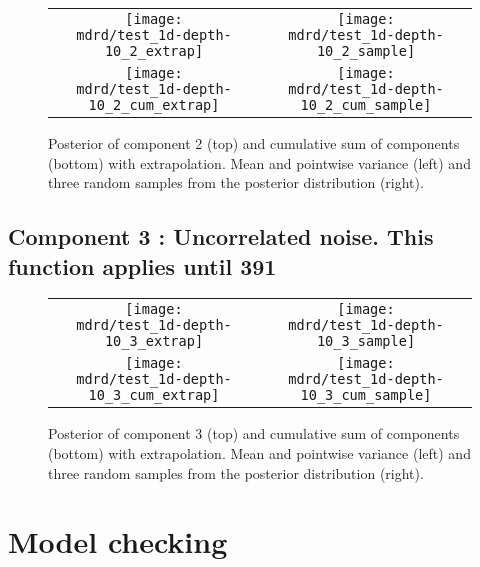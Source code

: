 \documentclass{article} %
\begin{document}


\begin{figure}[H]
\newcommand{\wmgd}{0.5\columnwidth}
\newcommand{\hmgd}{3.0cm}
\newcommand{\mdrd}{test_1d-depth-10}
\newcommand{\mbm}{\hspace{-0.3cm}}
\begin{tabular}{cc}
\mbm \texttt{[image: \\mdrd/test\_1d-depth-10\_2\_extrap]} & \texttt{[image: \\mdrd/test\_1d-depth-10\_2\_sample]} \\
\mbm \texttt{[image: \\mdrd/test\_1d-depth-10\_2\_cum\_extrap]} & \texttt{[image: \\mdrd/test\_1d-depth-10\_2\_cum\_sample]}
\end{tabular}
\caption{Posterior of component 2 (top) and cumulative sum of components (bottom) with extrapolation. Mean and pointwise variance (left) and three random samples from the posterior distribution (right).}
\label{fig:extrap2}
\end{figure}

\subsection{Component 3 : Uncorrelated noise. This function applies until  391}



\begin{figure}[H]
\newcommand{\wmgd}{0.5\columnwidth}
\newcommand{\hmgd}{3.0cm}
\newcommand{\mdrd}{test_1d-depth-10}
\newcommand{\mbm}{\hspace{-0.3cm}}
\begin{tabular}{cc}
\mbm \texttt{[image: \\mdrd/test\_1d-depth-10\_3\_extrap]} & \texttt{[image: \\mdrd/test\_1d-depth-10\_3\_sample]} \\
\mbm \texttt{[image: \\mdrd/test\_1d-depth-10\_3\_cum\_extrap]} & \texttt{[image: \\mdrd/test\_1d-depth-10\_3\_cum\_sample]}
\end{tabular}
\caption{Posterior of component 3 (top) and cumulative sum of components (bottom) with extrapolation. Mean and pointwise variance (left) and three random samples from the posterior distribution (right).}
\label{fig:extrap3}
\end{figure}

\section{Model checking}
\label{sec:check}
\end{document}
